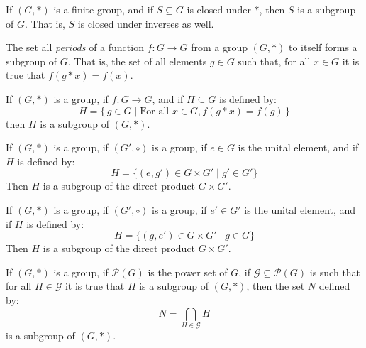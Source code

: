         \begin{theorem}
            If $(G,*)$ is a finite group, and if $S\subseteq{G}$ is closed under
            $*$, then $S$ is a subgroup of $G$. That is, $S$ is closed under
            inverses as well.
        \end{theorem}
        The set all \textit{periods} of a function $f:G\rightarrow{G}$ from a
        group $(G,*)$ to itself forms a subgroup of $G$. That is, the set of
        all elements $g\in{G}$ such that, for all $x\in{G}$ it is true that
        $f(g*x)=f(x)$.
        \begin{theorem}
            If $(G,*)$ is a group, if $f:G\rightarrow{G}$, and if
            $H\subseteq{G}$ is defined by:
            \begin{equation}
                H=\{\,g\in{G}\;|\;\textrm{For all }x\in{G},f(g*x)=f(g)\,\}
            \end{equation}
            then $H$ is a subgroup of $(G,*)$.
        \end{theorem}
        \begin{theorem}
            If $(G,*)$ is a group, if $(G',\circ)$ is a group, if $e\in{G}$ is
            the unital element, and if $H$ is defined by:
            \begin{equation}
                H=\{(e,g')\in{G}\times{G}'\;|\;g'\in{G}'\}
            \end{equation}
            Then $H$ is a subgroup of the direct product $G\times{G}'$.
        \end{theorem}
        \begin{theorem}
            If $(G,*)$ is a group, if $(G',\circ)$ is a group, if $e'\in{G}'$ is
            the unital element, and if $H$ is defined by:
            \begin{equation}
                H=\{(g,e')\in{G}\times{G}'\;|\;g\in{G}\}
            \end{equation}
            Then $H$ is a subgroup of the direct product $G\times{G}'$.
        \end{theorem}
        \begin{theorem}
            If $(G,*)$ is a group, if $\mathcal{P}(G)$ is the power set of $G$,
            if $\mathcal{G}\subseteq\mathcal{P}(G)$ is such that for all
            $H\in\mathcal{G}$ it is true that $H$ is a subgroup of $(G,*)$, then
            the set $N$ defined by:
            \begin{equation}
                N=\bigcap_{H\in\mathcal{G}}H
            \end{equation}
            is a subgroup of $(G,*)$.
        \end{theorem}
